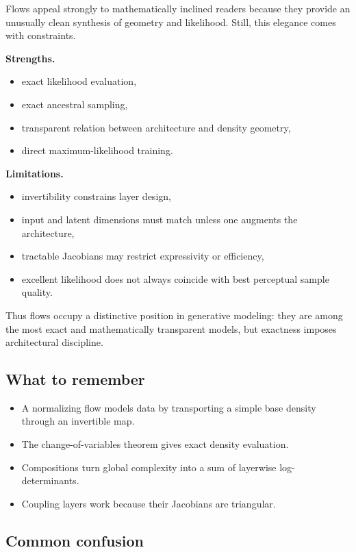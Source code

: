 Flows appeal strongly to mathematically inclined readers because they provide an unusually clean synthesis of geometry and likelihood.
Still, this elegance comes with constraints.

\medskip

\noindent
\textbf{Strengths.}
\begin{itemize}
    \item exact likelihood evaluation,
    \item exact ancestral sampling,
    \item transparent relation between architecture and density geometry,
    \item direct maximum-likelihood training.
\end{itemize}

\noindent
\textbf{Limitations.}
\begin{itemize}
    \item invertibility constrains layer design,
    \item input and latent dimensions must match unless one augments the architecture,
    \item tractable Jacobians may restrict expressivity or efficiency,
    \item excellent likelihood does not always coincide with best perceptual sample quality.
\end{itemize}

Thus flows occupy a distinctive position in generative modeling: they are among the most exact and mathematically transparent models, but exactness imposes architectural discipline.

\subsection*{What to remember}

\begin{itemize}
    \item A normalizing flow models data by transporting a simple base density through an invertible map.
    \item The change-of-variables theorem gives exact density evaluation.
    \item Compositions turn global complexity into a sum of layerwise log-determinants.
    \item Coupling layers work because their Jacobians are triangular.
\end{itemize}

\subsection*{Common confusion}

